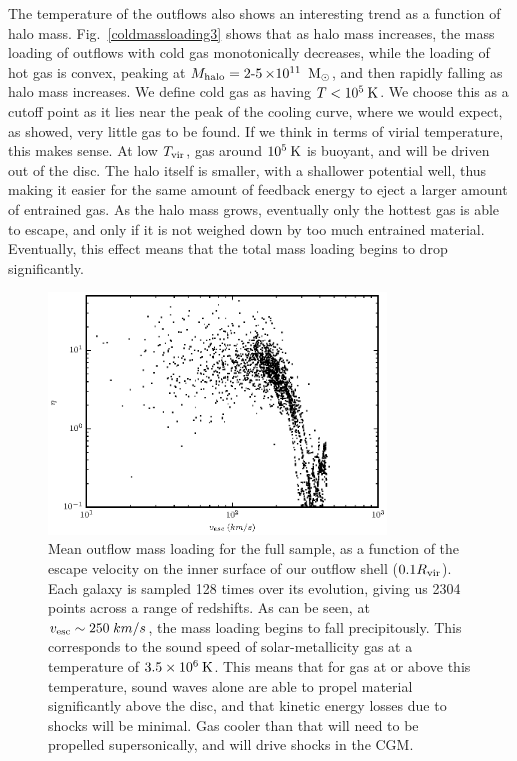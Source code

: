 The temperature of the outflows also shows an interesting trend as a function of
halo mass.  Fig.~\ref{coldmassloading3} shows that as halo mass increases, the
mass loading of outflows with cold gas monotonically decreases, while the
loading of hot gas is convex, peaking at $M_{\rm halo} =
\operatorname{2-5}\times10^{11}\;\>{\rm M_{\odot}}$, and then rapidly falling as halo mass
increases.  We define cold gas as having $T<10^5\>{\rm K}$.  We choose this as a cutoff
point as it lies near the peak of the cooling curve, where we would expect, as
\citet{Woods2014} showed, very little gas to be found.  If we think in terms of
virial temperature, this makes sense.  At low $T_{\rm vir}$, gas around $10^5\>{\rm K}$ is
buoyant, and will be driven out of the disc.  The halo itself is smaller, with a
shallower potential well, thus making it easier for the same amount of feedback
energy to eject a larger amount of entrained gas.  As the halo mass grows,
eventually only the hottest gas is able to escape, and only if it is not weighed
down by too much entrained material.  Eventually, this effect means that the
total mass loading begins to drop significantly.
\begin{figure}
    \includegraphics[width=0.8\textwidth]{figures3/massloading_escape.eps}
    \caption[Mass loading vs. escape velocity of disc]{Mean outflow mass loading for the full sample, as a function of the
        escape velocity on the inner surface of our outflow shell
        ($0.1R_{\rm vir}$).  Each galaxy is sampled 128 times over its evolution,
        giving us 2304 points across a range of redshifts.  As can be seen, at
        $v_{\rm esc}\sim 250\;km/s$, the mass loading begins to fall precipitously.
        This corresponds to the sound speed of solar-metallicity gas at a
        temperature of $3.5\times10^{6}\>{\rm K}$.  This means that for gas at or
        above this temperature, sound waves alone are able to propel material
        significantly above the disc, and that kinetic energy losses due to
        shocks will be minimal.  Gas cooler than that will need to be propelled
        supersonically, and will drive shocks in the CGM.}
    \label{massloading_escape3}
\end{figure}

